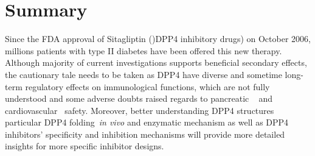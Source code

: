 \section{\label{chap:Sum} Summary}
Since the FDA approval of Sitagliptin ()DPP4 inhibitory drugs) on October 2006, millions patients with type II diabetes have been offered this new therapy. Although majority of current investigations supports beneficial secondary effects, the cautionary tale needs to be taken as DPP4 have diverse and sometime long-term regulatory effects on immunological functions, which are not fully understood and some adverse doubts raised regards to pancreatic ~\cite{Egan2014, Jermendy2016} and cardiovascular~\cite{Scirica2013} safety. Moreover, better understanding DPP4 structures particular DPP4 folding~\textit{in vivo} and enzymatic mechanism as well as DPP4 inhibitors' specificity and inhibition mechanisms will provide more detailed insights for more specific inhibitor designs.  
